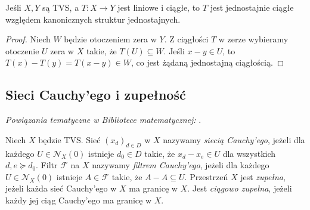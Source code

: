 \begin{twierdzenie}
\label{thm:linear-uniform}
Jeśli $X,Y$ są TVS, a $T:X\to Y$ jest liniowe i ciągłe,
to $T$ jest jednostajnie ciągłe względem kanonicznych
struktur jednostajnych.
\end{twierdzenie}
\begin{proof}
Niech $W$ będzie otoczeniem zera w $Y$. Z ciągłości $T$ w zerze
wybieramy otoczenie $U$ zera w $X$ takie, że $T(U)\subseteq W$.
Jeśli $x-y\in U$, to $T(x)-T(y)=T(x-y)\in W$, co jest
żądaną jednostajną ciągłością.
\end{proof}

\subsection{Sieci Cauchy'ego i zupełność}

\noindent\emph{Powiązania tematyczne w Bibliotece matematycznej:} .


\begin{definicja}
\label{def:tvs-complete}
Niech $X$ będzie TVS. Sieć $(x_d)_{d\in D}$ w $X$ nazywamy
\emph{siecią Cauchy'ego}, jeżeli dla każdego $U\in\mathcal N_X(0)$
istnieje $d_0\in D$ takie, że
$ x_d-x_e\in U $ dla wszystkich $d,e\succeq d_0$.
Filtr $\mathcal F$ na $X$ nazywamy \emph{filtrem Cauchy'ego},
jeżeli dla każdego $U\in\mathcal N_X(0)$ istnieje
$A\in\mathcal F$ takie, że $A-A\subseteq U$.
Przestrzeń $X$ jest \emph{zupełna}, jeżeli każda sieć Cauchy'ego
w $X$ ma granicę w $X$. Jest \emph{ciągowo zupełna},
jeżeli każdy jej ciąg Cauchy'ego ma granicę w $X$.
\end{definicja}

